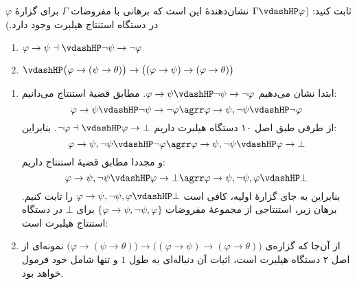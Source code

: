 ثابت کنید: ($\Gamma \vdashHP \varphi$ نشان‌دهندهٔ این است که برهانی با مفروضات $\Gamma$ برای گزارهٔ $\varphi$ در دستگاه استنتاج هیلبرت وجود دارد.)
\begin{enumerate}[label=(\alph*)]
  \item $\varphi \rightarrow \psi \dashv\vdashHP \neg\psi \rightarrow \neg\varphi$
  \item $\vdashHP \big(\varphi \rightarrow (\psi \rightarrow \theta)\big) \rightarrow \big((\varphi \rightarrow \psi) \rightarrow (\varphi \rightarrow \theta)\big)$
\end{enumerate}
\quad\vspace*{-0.5cm}
\begin{ans}
  \begin{enumerate}[label=(\alph*)]
      \item 
      ابتدا نشان می‌دهیم $\varphi \rightarrow \psi \vdashHP \neg\psi \rightarrow \neg\varphi$. مطابق قضیهٔ استنتاج می‌دانیم:
      $$\varphi \rightarrow \psi \vdashHP \neg\psi \rightarrow \neg\varphi
      \agrr
      \varphi \rightarrow \psi, \neg\psi \vdashHP \neg\varphi
      $$
      از طرفی طبق اصل ۱۰ دستگاه هیلبرت داریم $\neg\varphi \dashv\vdashHP \varphi\rightarrow\bot$. بنابراین:
      $$\varphi \rightarrow \psi, \neg\psi \vdashHP \neg\varphi
      \agrr
      \varphi \rightarrow \psi, \neg\psi \vdashHP \varphi\rightarrow\bot
      $$
      و مجددا مطابق قضیهٔ استنتاج داریم:
      $$
      \varphi \rightarrow \psi, \neg\psi \vdashHP \varphi\rightarrow\bot
      \agrr
      \varphi \rightarrow \psi, \neg\psi, \varphi \vdashHP \bot
      $$
      بنابراین به جای گزارهٔ اولیه، کافی است $\varphi \rightarrow \psi, \neg\psi, \varphi \vdashHP \bot$ را ثابت کنیم. برهان زیر، استنتاجی از مجموعهٔ مفروضات $\{\varphi \rightarrow \psi, \neg\psi, \varphi\}$ برای $\bot$ در دستگاه استنتاج هیلبرت است:
      \RTL
      \item از آن‌جا که گزاره‌ی $\big(\varphi \rightarrow (\psi \rightarrow \theta)\big) \rightarrow \big((\varphi \rightarrow \psi) \rightarrow (\varphi \rightarrow \theta)\big)$ نمونه‌ای از اصل ۲ دستگاه هیلبرت است، اثبات آن دنباله‌ای به طول $1$ و تنها شامل خود فرمول خواهد بود.
  \end{enumerate}
\end{ans}
